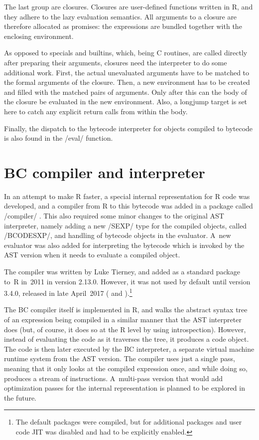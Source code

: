 {The last group are closures. Closures are user-defined functions written in R, and they adhere to the lazy evaluation semantics. All arguments to a closure are therefore allocated as promises: the expressions are bundled together with the enclosing environment.

As opposed to specials and builtins, which, being C routines, are called directly after preparing their arguments, closures need the interpreter to do some additional work. First, the actual unevaluated arguments have to be matched to the formal arguments of the closure. Then, a new environment has to be created and filled with the matched pairs of arguments. Only after this can the body of the closure be evaluated in the new environment. Also, a longjump target is set here to catch any explicit return calls from within the body.

Finally, the dispatch to the bytecode interpreter for objects compiled to bytecode is also found in the \cinline/eval/ function.


\section{BC compiler and interpreter}

In an attempt to make R faster, a special internal representation for R code was developed, and a compiler from R to this bytecode was added in a package called \rinline/compiler/ \autocite{compiler}. This also required some minor changes to the original AST interpreter, namely adding a new \cinline/SEXP/ type for the compiled objects, called \cinline/BCODESXP/, and handling of bytecode objects in the evaluator. A~new evaluator was also added for interpreting the bytecode which is invoked by the AST version when it needs to evaluate a compiled object.

The compiler was written by Luke Tierney, and added as a standard package to~R in~2011 in version 2.13.0. However, it was not used by default until version 3.4.0, released in late April~2017 (\autocite{announce2011} and \autocite{announce2017}).\footnote{The default packages were compiled, but for additional packages and user code JIT was disabled and had to be explicitly enabled.}

The BC compiler itself is implemented in R, and walks the abstract syntax tree of an expression being compiled in a similar manner that the AST interpreter does (but, of course, it does so at the R level by using introspection). However, instead of evaluating the code as it traverses the tree, it produces a code object. The code is then later executed by the BC interpreter, a separate virtual machine runtime system from the AST version. The compiler uses just a single pass, meaning that it only looks at the compiled expression once, and while doing so, produces a stream of instructions. A~multi-pass version that would add optimization passes for the internal representation is planned to be explored in the future.

}
